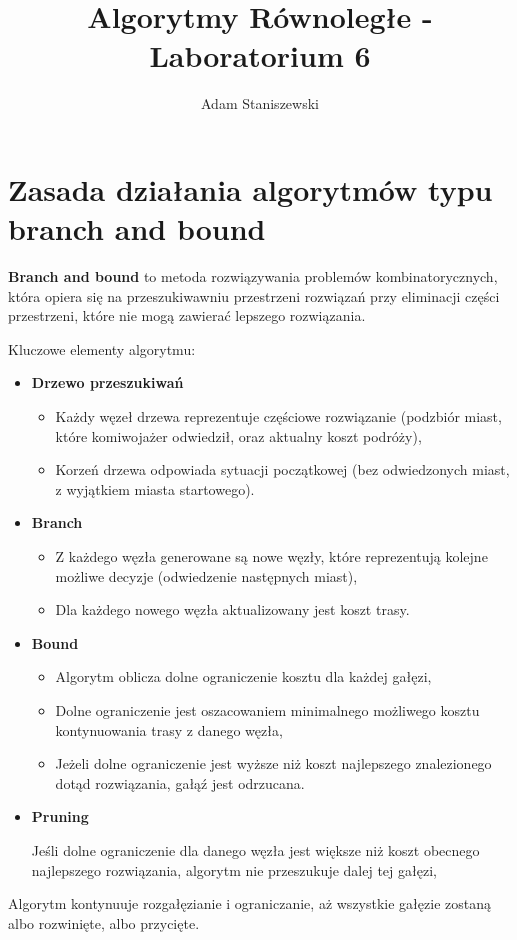 \documentclass{article}
\title{Algorytmy Równoległe - Laboratorium 6}
\author{Adam Staniszewski}
\begin{document}
\setlength{\parindent}{0pt}

\maketitle

\section{Zasada działania algorytmów typu branch and bound}
\textbf{Branch and bound} to metoda rozwiązywania problemów kombinatorycznych, która opiera się na przeszukiwawniu przestrzeni rozwiązań przy eliminacji części przestrzeni, które nie mogą zawierać lepszego rozwiązania.

\vspace{1em}
Kluczowe elementy algorytmu:
\begin{itemize}
    \item \textbf{Drzewo przeszukiwań}
    \begin{itemize}
        \item Każdy węzeł drzewa reprezentuje częściowe rozwiązanie (podzbiór miast, które komiwojażer odwiedził, oraz aktualny koszt podróży),
        \item Korzeń drzewa odpowiada sytuacji początkowej (bez odwiedzonych miast, z wyjątkiem miasta startowego).
    \end{itemize}
    \item \textbf{Branch}
    \begin{itemize}
        \item Z każdego węzła generowane są nowe węzły, które reprezentują kolejne możliwe decyzje (odwiedzenie następnych miast),
        \item Dla każdego nowego węzła aktualizowany jest koszt trasy.
    \end{itemize}
    \item \textbf{Bound}
    \begin{itemize}
        \item Algorytm oblicza dolne ograniczenie kosztu dla każdej gałęzi,
        \item Dolne ograniczenie jest oszacowaniem minimalnego możliwego kosztu kontynuowania trasy z danego węzła,
        \item Jeżeli dolne ograniczenie jest wyższe niż koszt najlepszego znalezionego dotąd rozwiązania, gałąź jest odrzucana.
    \end{itemize}
    \item \textbf{Pruning}
    \begin{itemize}
        Jeśli dolne ograniczenie dla danego węzła jest większe niż koszt obecnego najlepszego rozwiązania, algorytm nie przeszukuje dalej tej gałęzi,
    \end{itemize}
\end{itemize}
Algorytm kontynuuje rozgałęzianie i ograniczanie, aż wszystkie gałęzie zostaną albo rozwinięte, albo przycięte.
\end{document}
